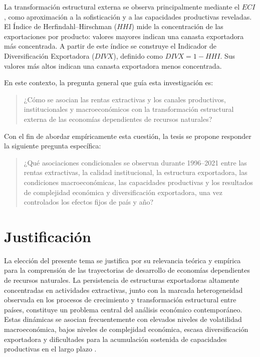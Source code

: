 \documentclass[../../TFM.tex]{subfiles}
\begin{document}
	La transformación
	estructural externa se observa principalmente mediante el $ECI$, como
	aproximación a la sofisticación y a las capacidades productivas reveladas.
	El Índice de Herfindahl--Hirschman ($HHI$) mide la concentración de las
	exportaciones por producto: valores mayores indican una canasta exportadora
	más concentrada. A partir de este índice se construye el Indicador de
	Diversificación Exportadora ($DIVX$), definido como $DIVX=1-HHI$. Sus valores
	más altos indican una canasta exportadora menos concentrada.

	En este contexto, la pregunta general que guía esta investigación es:

	\begin{quote}
	¿Cómo se asocian las rentas extractivas y los canales productivos,
	institucionales y macroeconómicos con la transformación estructural externa de
	las economías dependientes de recursos naturales?
	\end{quote}

	Con el fin de abordar empíricamente esta cuestión, la tesis se propone responder la siguiente pregunta específica:

	\begin{quote}
	¿Qué asociaciones condicionales se observan durante 1996--2021 entre las
	rentas extractivas, la calidad institucional, la estructura exportadora, las
	condiciones macroeconómicas, las capacidades productivas y los resultados de
	complejidad económica y diversificación exportadora, una vez controlados los
	efectos fijos de país y año?
	\end{quote}

	\chapter{Justificación}
	\label{chap:justificacion}

	La elección del presente tema se justifica por su relevancia teórica y empírica para la comprensión de las trayectorias de desarrollo de economías dependientes de recursos naturales. La persistencia de estructuras exportadoras altamente concentradas en actividades extractivas, junto con la marcada heterogeneidad observada en los procesos de crecimiento y transformación estructural entre países, constituye un problema central del análisis económico contemporáneo. Estas dinámicas se asocian frecuentemente con elevados niveles de volatilidad macroeconómica, bajos niveles de complejidad económica, escasa diversificación exportadora y dificultades para la acumulación sostenida de capacidades productivas en el largo plazo \parencite{Auty1993,Sachs1995}.
\end{document}
